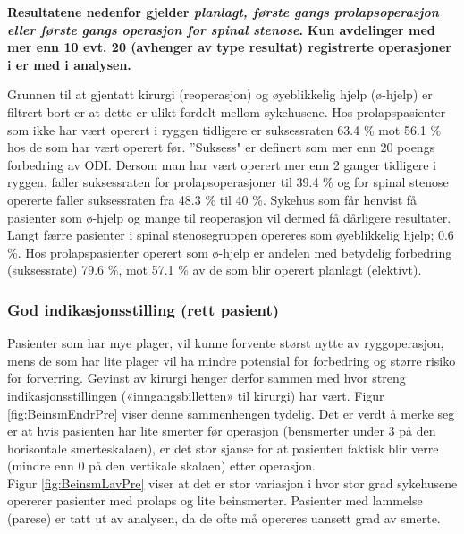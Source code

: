 



\textbf{Resultatene nedenfor gjelder  \textit{planlagt, første gangs prolapsoperasjon eller første gangs operasjon for spinal stenose}.} \textbf{Kun avdelinger med mer enn 10 evt. 20 (avhenger av type resultat) registrerte operasjoner i er med i
analysen.}
 
 Grunnen til at gjentatt kirurgi (reoperasjon) og øyeblikkelig hjelp (ø-hjelp)
er filtrert bort er at dette er ulikt fordelt mellom sykehusene. Hos prolapspasienter som ikke har vært operert i ryggen tidligere er suksessraten 63.4 \% mot 56.1 \%
hos de som har vært operert før. ''Suksess" er definert som mer enn 20 poengs forbedring av ODI. Dersom man har vært operert mer enn 2 ganger tidligere i
ryggen, faller suksessraten for prolapsoperasjoner til 39.4 \% og for spinal stenose opererte faller suksessraten fra 48.3 \% til 40 \%. 
Sykehus som får henvist få pasienter som ø-hjelp og
mange til reoperasjon vil dermed få dårligere resultater. 
Langt færre pasienter i spinal stenosegruppen opereres som øyeblikkelig hjelp; 0.6 \%. 
Hos prolapspasienter operert som ø-hjelp er andelen med betydelig forbedring (suksessrate)  79.6 \%, mot 57.1 \% av de som blir operert planlagt (elektivt). 





\subsubsection{God indikasjonsstilling (rett pasient)}



Pasienter som har mye plager, vil kunne forvente størst nytte av ryggoperasjon,
mens de som har lite plager vil ha mindre potensial for forbedring og større risiko
for forverring. Gevinst av kirurgi henger derfor sammen med hvor streng
indikasjonsstillingen («inngangsbilletten» til kirurgi) har vært. Figur \ref{fig:BeinsmEndrPre} viser denne
sammenhengen tydelig. Det er verdt å merke seg er at hvis pasienten har lite smerter før
operasjon (bensmerter under 3 på den horisontale smerteskalaen), er det stor
sjanse for at pasienten faktisk blir verre (mindre enn 0 på den vertikale skalaen) etter
operasjon. \\
Figur \ref{fig:BeinsmLavPre} viser at det er stor variasjon i hvor stor grad sykehusene opererer
pasienter med prolaps og lite beinsmerter. Pasienter med lammelse (parese) er tatt
ut av analysen, da de ofte må opereres uansett grad av smerte.



